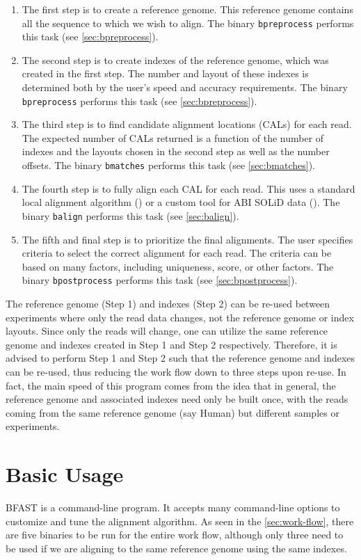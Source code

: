 \documentclass[a4paper,12pt]{book}
\newcommand{\TT}[1]{{\tt #1}} %
\begin{document}
\begin{enumerate}
	\item
		The first step is to create a reference genome.
		This reference genome contains all the sequence to which we wish to align.
		The binary \TT{bpreprocess} performs this task (see \autoref{sec:bpreprocess}).
	\item
		The second step is to create indexes of the reference genome, which was created in the first step.
		The number and layout of these indexes is determined both by the user's speed and accuracy requirements.
		The binary \TT{bpreprocess} performs this task (see \autoref{sec:bpreprocess}).
	\item
		The third step is to find candidate alignment locations (CALs) for each read.
		The expected number of CALs returned is a function of the number of indexes and the layouts chosen in the second step as well as the number offsets.
		The binary \TT{bmatches} performs this task (see \autoref{sec:bmatches}).
	\item
		The fourth step is to fully align each CAL for each read.
		This uses a standard local alignment algorithm (\cite{SmithWaterman}) or a custom tool for ABI SOLiD data (\cite{BFAST-local-alignment}).
		The binary \TT{balign} performs this task (see \autoref{sec:balign}).
	\item
		The fifth and final step is to prioritize the final alignments.
		The user specifies criteria to select the correct alignment for each read.
		The criteria can be based on many factors, including uniqueness, score, or other factors.
		The binary \TT{bpostprocess} performs this task (see \autoref{sec:bpostprocess}).
\end{enumerate}

The reference genome (Step 1) and indexes (Step 2) can be re-used between experiments where only the read data changes, not the reference genome or index layouts.
Since only the reads will change, one can utilize the same reference genome and indexes created in Step 1 and Step 2 respectively.
Therefore, it is advised to perform Step 1 and Step 2 such that the reference genome and indexes can be re-used, thus reducing the work flow down to three steps upon re-use.
In fact, the main speed of this program comes from the idea that in general, the reference genome and associated indexes need only be built once, with the reads coming from the same reference genome (say Human) but different samples or experiments.

\chapter{Basic Usage}
BFAST is a command-line program.
It accepts many command-line options to customize and tune the alignment algorithm.
As seen in the \autoref{sec:work-flow}, there are five binaries to be run for the entire work flow, although only three need to be used if we are aligning to the same reference genome using the same indexes.
\end{document}
